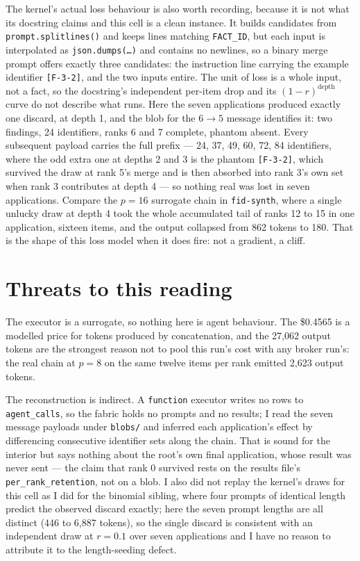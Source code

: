 \documentclass[11pt]{article}
\begin{document}
The kernel's actual loss behaviour is also worth recording, because it is not what its
docstring claims and this cell is a clean instance. It builds candidates from
\texttt{prompt.splitlines()} and keeps lines matching \texttt{FACT\_ID}, but each input is
interpolated as \texttt{json.dumps(\dots)} and contains no newlines, so a binary merge prompt
offers exactly three candidates: the instruction line carrying the example identifier
\texttt{[F-3-2]}, and the two inputs entire. The unit of loss is a whole input, not a fact,
so the docstring's independent per-item drop and its $(1-r)^{\text{depth}}$ curve do not
describe what runs. Here the seven applications produced exactly one discard, at depth 1,
and the blob for the $6\to5$ message identifies it: two findings, 24 identifiers, ranks 6 and
7 complete, phantom absent. Every subsequent payload carries the full prefix --- 24, 37, 49,
60, 72, 84 identifiers, where the odd extra one at depths 2 and 3 is the phantom
\texttt{[F-3-2]}, which survived the draw at rank 5's merge and is then absorbed into rank
3's own set when rank 3 contributes at depth 4 --- so nothing real was lost in seven
applications. Compare the
$p=16$ surrogate chain in \texttt{fid-synth}, where a single unlucky draw at depth 4 took the
whole accumulated tail of ranks 12 to 15 in one application, sixteen items, and the output
collapsed from 862 tokens to 180. That is the shape of this loss model when it does fire: not
a gradient, a cliff.

\section{Threats to this reading}

The executor is a surrogate, so nothing here is agent behaviour. The \$0.4565 is a modelled
price for tokens produced by concatenation, and the 27{,}062 output tokens are the strongest
reason not to pool this run's cost with any broker run's: the real chain at $p=8$ on the same
twelve items per rank emitted 2{,}623 output tokens.

The reconstruction is indirect. A \texttt{function} executor writes no rows to
\texttt{agent\_calls}, so the fabric holds no prompts and no results; I read the seven
message payloads under \texttt{blobs/} and inferred each application's effect by differencing
consecutive identifier sets along the chain. That is sound for the interior but says nothing
about the root's own final application, whose result was never sent --- the claim that rank 0
survived rests on the results file's \texttt{per\_rank\_retention}, not on a blob. I also did
not replay the kernel's draws for this cell as I did for the binomial sibling, where four
prompts of identical length predict the observed discard exactly; here the seven prompt
lengths are all distinct (446 to 6{,}887 tokens), so the single discard is consistent with an
independent draw at $r=0.1$ over seven applications and I have no reason to attribute it to
the length-seeding defect.
\end{document}
